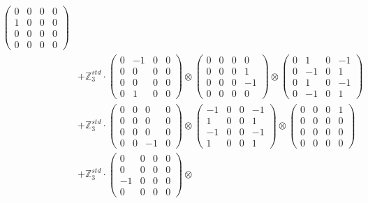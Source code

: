 \documentclass{article}
\begin{document}
{\begin{align}
            \begin{pmatrix} 0 & 0 & 0 & 0 \\ 1 & 0 & 0 & 0 \\ 0 & 0 & 0 & 0 \\ 0 & 0 & 0 & 0 \end{pmatrix} \\ 
        &+ \label{Rs16-Rc11-Solution-7-c25} \mathbb{Z}_3^{std} \cdot 
            \begin{pmatrix} 0 & -1 & 0 & 0 \\ 0 & 0 & 0 & 0 \\ 0 & 0 & 0 & 0 \\ 0 & 1 & 0 & 0 \end{pmatrix} \otimes 
            \begin{pmatrix} 0 & 0 & 0 & 0 \\ 0 & 0 & 0 & 1 \\ 0 & 0 & 0 & -1 \\ 0 & 0 & 0 & 0 \end{pmatrix} \otimes 
            \begin{pmatrix} 0 & 1 & 0 & -1 \\ 0 & -1 & 0 & 1 \\ 0 & 1 & 0 & -1 \\ 0 & -1 & 0 & 1 \end{pmatrix} \\ 
        &+ \label{Rs16-Rc11-Solution-7-c26} \mathbb{Z}_3^{std} \cdot 
            \begin{pmatrix} 0 & 0 & 0 & 0 \\ 0 & 0 & 0 & 0 \\ 0 & 0 & 0 & 0 \\ 0 & 0 & -1 & 0 \end{pmatrix} \otimes 
            \begin{pmatrix} -1 & 0 & 0 & -1 \\ 1 & 0 & 0 & 1 \\ -1 & 0 & 0 & -1 \\ 1 & 0 & 0 & 1 \end{pmatrix} \otimes 
            \begin{pmatrix} 0 & 0 & 0 & 1 \\ 0 & 0 & 0 & 0 \\ 0 & 0 & 0 & 0 \\ 0 & 0 & 0 & 0 \end{pmatrix} \\ 
        &+ \label{Rs16-Rc11-Solution-7-c27} \mathbb{Z}_3^{std} \cdot 
            \begin{pmatrix} 0 & 0 & 0 & 0 \\ 0 & 0 & 0 & 0 \\ -1 & 0 & 0 & 0 \\ 0 & 0 & 0 & 0 \end{pmatrix} \otimes 

\end{align}}
\end{document}
